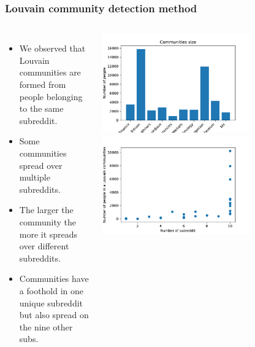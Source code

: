 \documentclass[aspectratio=169]{beamer}
\begin{document}
\begin{frame}[t]
    \frametitle{Louvain community detection method}

    \begin{columns}
        \begin{itemize}
            \item We observed that Louvain communities are formed from people belonging to the same subreddit.
            \item Some communities spread over multiple subreddits.
            \item The larger the community the more it spreads over different subreddits.
            \item Communities have a foothold in one unique subreddit but also spread on the nine other subs.
        \end{itemize}
        \includegraphics[width=0.7\textwidth]{figures/communities_size.pdf}
        \includegraphics[width=0.7\textwidth]{figures/communities_repartition_by_size.pdf}
    \end{columns}
\end{frame}
\end{document}
